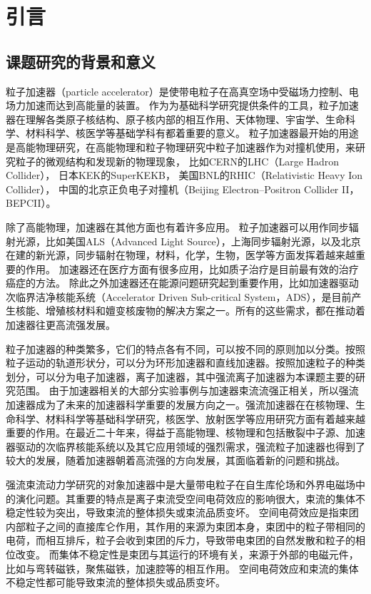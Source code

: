 
\chapter{引言}
\label{chap:Introduction}

\section{课题研究的背景和意义}
\label{section:background}
粒子加速器（particle accelerator）是使带电粒子在高真空场中受磁场力控制、电场力加速而达到高能量的装置。
作为为基础科学研究提供条件的工具，粒子加速器在理解各类原子核结构、原子核内部的相互作用、天体物理、宇宙学、生命科学、材料科学、核医学等基础学科有都着重要的意义。
粒子加速器最开始的用途是高能物理研究，在高能物理和粒子物理研究中粒子加速器作为对撞机使用，来研究粒子的微观结构和发现新的物理现象，
比如CERN的LHC（Large Hadron Collider），
日本KEK的SuperKEKB，
美国BNL的RHIC（Relativistic Heavy Ion Collider），
中国的北京正负电子对撞机（Beijing Electron–Positron Collider II，BEPCII）。

除了高能物理，加速器在其他方面也有着许多应用。
粒子加速器可以用作同步辐射光源，比如美国ALS（Advanced Light Source），上海同步辐射光源，以及北京在建的新光源，同步辐射在物理，材料，化学，生物，医学等方面发挥着越来越重要的作用。
加速器还在医疗方面有很多应用，比如质子治疗是目前最有效的治疗癌症的方法。
除此之外加速器还在能源问题研究起到重要作用，比如加速器驱动次临界洁净核能系统（Accelerator Driven Sub-critical System，ADS），是目前产生核能、增殖核材料和嬗变核废物的解决方案之一。所有的这些需求，都在推动着加速器往更高流强发展。

粒子加速器的种类繁多，它们的特点各有不同，可以按不同的原则加以分类。按照粒子运动的轨道形状分，可以分为环形加速器和直线加速器。按照加速粒子的种类划分，可以分为电子加速器，离子加速器，其中强流离子加速器为本课题主要的研究范围。
由于加速器相关的大部分实验事例与加速器束流流强正相关，所以强流加速器成为了未来的加速器科学重要的发展方向之一。强流加速器在在核物理、生命科学、材料科学等基础科学研究，核医学、放射医学等应用研究方面有着越来越重要的作用。在最近二十年来，得益于高能物理、核物理和包括散裂中子源、加速器驱动的次临界核能系统以及其它应用领域的强烈需求，强流粒子加速器也得到了较大的发展\cite{wei2003synchrotrons,chou2002synchrotron}，随着加速器朝着高流强的方向发展，其面临着新的问题和挑战。

强流束流动力学研究的对象加速器中是大量带电粒子在自生库伦场和外界电磁场中的演化问题。其重要的特点是离子束流受空间电荷效应的影响很大，束流的集体不稳定性较为突出，导致束流的整体损失或束流品质变坏。
空间电荷效应是指束团内部粒子之间的直接库仑作用，其作用的来源为束团本身，束团中的粒子带相同的电荷，而相互排斥，粒子会收到束团的斥力，导致带电束团的自然发散和粒子的相位改变。
而集体不稳定性是束团与其运行的环境有关，来源于外部的电磁元件，比如与弯转磁铁，聚焦磁铁，加速腔等的相互作用。
空间电荷效应和束流的集体不稳定性都可能导致束流的整体损失或品质变坏。

